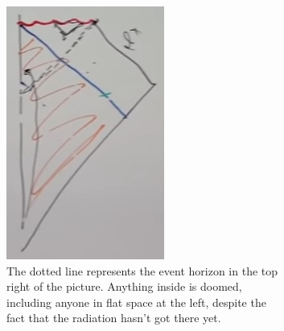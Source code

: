 \documentclass[]{article}
\begin{document}
{\begin{figure}[H]
	\begin{center}
		\caption{Black hole formed by incoming radiation shell. }
		\begin{subfigure}[t]{0.45\textwidth}
			\caption{The dotted line represents the event horizon in the top right of the picture. Anything inside is doomed, including anyone in flat space at the left, despite the fact that the radiation hasn't got there yet.}\label{fig:gr-8-newton-shwartzschild}
			\includegraphics[width=\textwidth]{gr-8-newton-shwartzschild}
		\end{subfigure}
		\begin{subfigure}[t]{0.45\textwidth}

\end{subfigure}
\end{center}
\end{figure}}
\end{document}
